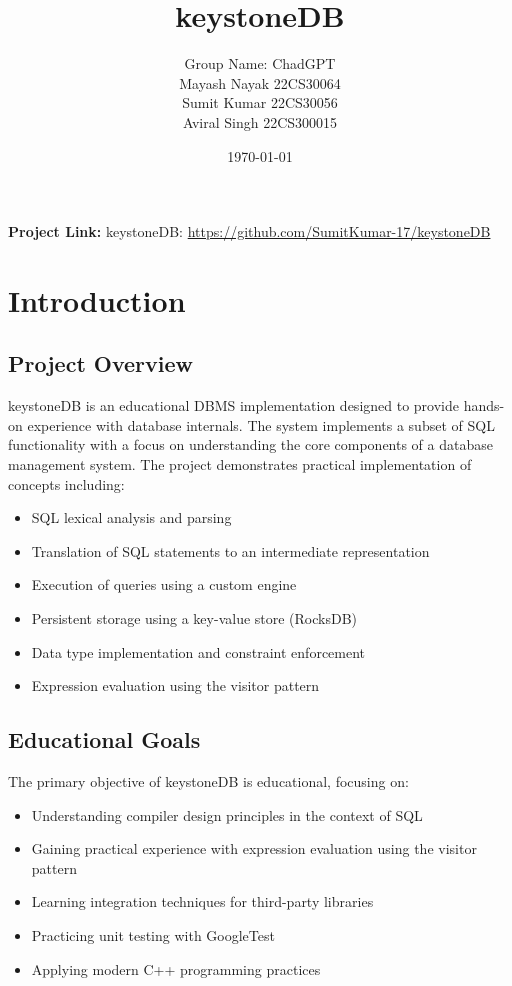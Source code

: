 \documentclass[12pt,a4paper]{article}
\title{\textbf{keystoneDB}}
\author{
    Group Name: ChadGPT \\
    Mayash Nayak 22CS30064 \\
    Sumit Kumar 22CS30056 \\
    Aviral Singh 22CS300015 \\
    \vspace{1cm}
}
\date{\today}
\begin{document}
\maketitle


\vspace{0.5cm}
\begin{center}
\textbf{Project Link:} keystoneDB: \url{https://github.com/SumitKumar-17/keystoneDB}
\end{center}

\pagebreak

\tableofcontents
\clearpage  %

\section{Introduction}
\subsection{Project Overview}
keystoneDB is an educational DBMS implementation designed to provide hands-on experience with database internals. The system implements a subset of SQL functionality with a focus on understanding the core components of a database management system. The project demonstrates practical implementation of concepts including:

\begin{itemize}
    \item SQL lexical analysis and parsing
    \item Translation of SQL statements to an intermediate representation
    \item Execution of queries using a custom engine
    \item Persistent storage using a key-value store (RocksDB)
    \item Data type implementation and constraint enforcement
    \item Expression evaluation using the visitor pattern
\end{itemize}

\subsection{Educational Goals}
The primary objective of keystoneDB is educational, focusing on:
\begin{itemize}
    \item Understanding compiler design principles in the context of SQL
    \item Gaining practical experience with expression evaluation using the visitor pattern
    \item Learning integration techniques for third-party libraries
    \item Practicing unit testing with GoogleTest
    \item Applying modern C++ programming practices
\end{itemize}
\end{document}
